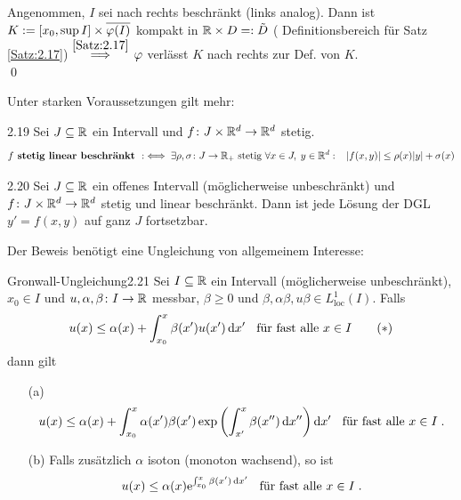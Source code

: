 \documentclass[a4paper]{article}
\begin{document}
\begin{Beweis}
Angenommen, $I$ sei nach rechts beschränkt (links analog). Dann ist $K:=[x_0,\sup I]\times \overline{\operatorname{\varphi}(I)}$ kompakt in $\mathbb R\times D=:\tilde{D}$ ( Definitionsbereich für Satz \ref{Satz:2.17}) $\overset{\ref{Satz:2.17}}{\implies}$ $\operatorname{\varphi}$ verlässt $K$ nach rechts \lightning{} zur Def. von $K$.\\\qed
\end{Beweis}

Unter starken Voraussetzungen gilt mehr:
\begin{Def}{}{2.19}
Sei $J\subseteq\mathbb R$ ein Intervall und $f\colon J\times \mathbb R^d\to\mathbb R^d$ stetig.
\[f\textbf{ stetig linear beschränkt }:\iff \exists \rho,\sigma\colon J\to \mathbb R_+\text{ stetig }\forall x\in J,\;y\in\mathbb R^d:\;\;\;|f(x,y)|\le\rho(x)|y|+\sigma(x)\]
\end{Def}

\begin{Satz}{}{2.20}
Sei $J\subseteq \mathbb R$ ein offenes Intervall (möglicherweise unbeschränkt) und $f\colon J\times\mathbb R^d\to\mathbb R^d$ stetig und linear beschränkt. Dann ist jede Lösung der DGL $y'=f(x,y)$ auf ganz $J$ fortsetzbar.
\end{Satz}

Der Beweis benötigt eine Ungleichung von allgemeinem Interesse:

\begin{Satz}{Gronwall-Ungleichung}{2.21}
Sei $I\subseteq \mathbb R$ ein Intervall (möglicherweise unbeschränkt), $x_0\in I$ und $u,\alpha,\beta\colon I\to\mathbb R$ messbar, $\beta\ge 0$ und $\beta,\alpha\beta,u\beta\in L^1_{\text{loc}}(I)$. Falls 
\[u(x)\le \alpha(x)+\int_{x_0}^x\beta(x')u(x')\mathop{}\!\mathrm{d} x'\;\;\text{ für fast alle $x\in I$}\tag{$*$}\label{44}\]
dann gilt
\begin{itemize}
\item[(a)] 
\[u(x)\le \alpha(x)+\int_{x_0}^x\alpha(x')\beta(x')\exp\left(\int_{x'}^x\beta(x'')\mathop{}\!\mathrm{d} x''\right)\mathop{}\!\mathrm{d} x'\;\;\text{ für fast alle $x\in I$}\;.\]
\item[(b)] Falls zusätzlich $\alpha$ isoton (monoton wachsend), so ist
\[u(x)\le \alpha(x)\mathrm{e}^{\int_{x_0}^x\beta(x')\mathop{}\!\mathrm{d} x'}\;\;\text{ für fast alle $x\in I$}\;.\]
\end{itemize}
\end{Satz}
\end{document}
